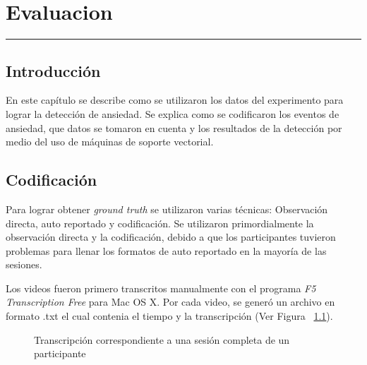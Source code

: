 
\chapter{Evaluacion}\label{capit:cap4}
\vspace{-2.0325ex}%
\noindent
\rule{\textwidth}{0.5pt}
\vspace{-5.5ex}%
\newcommand{\pushline}{\Indp}%

\section{Introducci\'on}\label{cap4:intro}
En este cap\'itulo se describe como se utilizaron los datos del experimento para lograr la detecci\'on de ansiedad. Se explica como se codificaron los eventos de ansiedad, que datos se tomaron en cuenta y los resultados de la detecci\'on por medio del uso de m\'aquinas de soporte vectorial.

\section{Codificaci\'on}
Para lograr obtener \textit{ground truth} se utilizaron varias t\'ecnicas: Observaci\'on directa, auto reportado y codificaci\'on. Se utilizaron primordialmente la observaci\'on directa y la codificaci\'on, debido a que los participantes tuvieron problemas para llenar los formatos de auto reportado en la mayor\'ia de las sesiones.

Los videos fueron primero transcritos manualmente con el programa \textit{F5 Transcription Free} para Mac OS X. Por cada video, se gener\'o un archivo en formato .txt el cual contenia el tiempo y la transcripci\'on (Ver Figura ~\ref{fig:f5transcript}). 

\begin{figure}[h]
        \centering
        \caption{Transcripci\'on correspondiente a una sesi\'on completa de un participante}\label{fig:f5transcript}
\end{figure}

